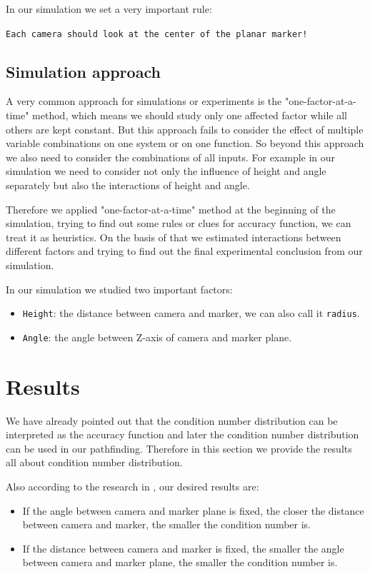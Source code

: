 In our simulation we set a very important rule:

\texttt{Each camera should look at the center of the planar marker!}

\subsection{Simulation approach}

A very common approach for simulations or experiments is the "one-factor-at-a-time" method\cite{wiki_ofaatm}, which means we should study only one affected factor while all others are kept constant. But this approach fails to consider the effect of multiple variable combinations on one system or on one function. So beyond this approach we also need to consider the combinations of all inputs. For example in our simulation we need to consider not only the influence of height and angle separately but also the interactions of height and angle.

Therefore we applied "one-factor-at-a-time" method at the beginning of the simulation, trying to find out some rules or clues for accuracy function, we can treat it as heuristics. On the basis of that we estimated interactions between different factors and trying to find out the final experimental conclusion from our simulation.

In our simulation we studied two important factors:
\begin{itemize}
\item \texttt{Height}: the distance between camera and marker, we can also call it \texttt{radius}. 
\item \texttt{Angle}: the angle between Z-axis of camera and marker plane.
\end{itemize}
\section{Results}
We have already pointed out that the condition number distribution can be interpreted as the accuracy function and later the condition number distribution can be used in our pathfinding. Therefore in this section we provide the results all about condition number distribution. 

Also according to the research in \cite{pentenrieder2006analysis}, our desired results are:
\begin{itemize}
\item If the angle between camera and marker plane is fixed, the closer the distance between camera and marker, the smaller the condition number is.
\item If the distance between camera and marker is fixed, the smaller the angle between camera and marker plane, the smaller the condition number is.
\end{itemize}

